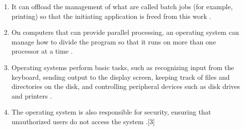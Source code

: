 \documentclass[11pt,a4paper]{article}
\begin{document}
\begin{enumerate}
		\item It can offload the management of what are called batch jobs (for example, printing) so that the initiating application is freed from this work .
		\item On computers that can provide parallel processing, an operating system can manage how to divide the program so that it runs on more than one processor at a time .
		\item Operating systems perform basic tasks, such as recognizing input from the keyboard, sending output to the display screen, keeping track of files and directories on the disk, and controlling peripheral devices such as disk drives and printers .
		\item The operating system is also responsible for security, ensuring that unauthorized users do not access the system .[3]
	\end{enumerate}
	
\end{document}
